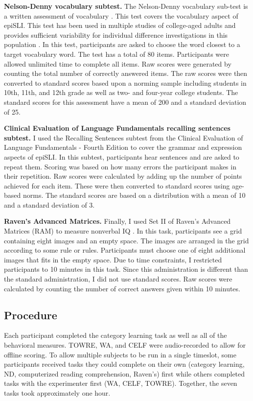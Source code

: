 \documentclass[../dissertation.tex]{subfiles}
\begin{document}
	\textbf{Nelson-Denny vocabulary subtest.} The Nelson-Denny vocabulary sub-test is a written assessment of vocabulary \citep{Brown1981}. This test covers the vocabulary aspect of epiSLI. This test has been used in multiple studies of college-aged adults and provides sufficient variability for individual difference investigations in this population \citetext{e.g., \citealt{Boudewyn2015}; \citealt{Stafura2014}}. In this test, participants are asked to choose the word closest to a target vocabulary word. The test has a total of 80 items. Participants were allowed unlimited time to complete all items. Raw scores were generated by counting the total number of correctly answered items. The raw scores were then converted to standard scores based upon a norming sample including students in 10th, 11th, and 12th grade as well as two- and four-year college students. The standard scores for this assessment have a mean of 200 and a standard deviation of 25. \par
	\textbf{Clinical Evaluation of Language Fundamentals recalling sentences subtest.} I used the Recalling Sentences subtest from the Clinical Evaluation of Language Fundamentals - Fourth Edition \citetext{CELF; \citealt{Semel2006}} to cover the grammar and expression aspects of epiSLI. In this subtest, participants hear sentences and are asked to repeat them. Scoring was based on how many errors the participant makes in their repetition. Raw scores were calculated by adding up the number of points achieved for each item. These were then converted to standard scores using age-based norms. The standard scores are based on a distribution with a mean of 10 and a standard deviation of 3. \par
	\textbf{Raven's Advanced Matrices.} Finally, I used Set II of Raven's Advanced Matrices (RAM) to measure nonverbal IQ \citep{Raven1998}. In this task, participants see a grid containing eight images and an empty space. The images are arranged in the grid according to some rule or rules. Participants must choose one of eight additional images that fits in the empty space. Due to time constraints, I restricted participants to 10 minutes in this task. Since this administration is different than the standard administration, I did not use standard scores. Raw scores were calculated by counting the number of correct answers given within 10 minutes.

\subsection{Procedure}
	Each participant completed the category learning task as well as all of the behavioral measures. TOWRE, WA, and CELF were audio-recorded to allow for offline scoring. To allow multiple subjects to be run in a single timeslot, some participants received tasks they could complete on their own (category learning, ND, computerized reading comprehension, Raven's) first while others completed tasks with the experimenter first (WA, CELF, TOWRE). Together, the seven tasks took approximately one hour.
	
\end{document}
